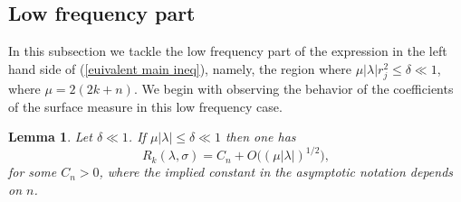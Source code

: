 \documentclass[11pt, reqno]{amsart}
\theoremstyle{plain}
\newtheorem{lemma}[theorem]{Lemma}
\theoremstyle{remark}
\theoremstyle{example}
\theoremstyle{definition}
\numberwithin{equation}{section}
\begin{document}
\subsection{Low frequency part } \label{Low part}
In this subsection we tackle the low frequency part of the expression in the left hand side of (\ref{euivalent main ineq}), namely, the region where $\mu |\lambda|   r_{j}^2 \leq \delta  \ll 1$, where $\mu = 2(2k+n)$. We begin with observing the behavior of the coefficients of the surface measure in this low frequency case.
\begin{lemma}\label{Surface coeff. low}
    Let $\delta \ll 1$. If $\mu |\lambda| \leq \delta \ll 1$ then one has 
    \begin{equation}\label{Low frequency surface coeff}
        R_{k}(\lambda, \sigma) =  C_{n} + O \big( (\mu |\lambda|)^{1/2} \big),
    \end{equation}
    for some $C_{n}>0$, where the implied constant in the asymptotic notation  depends on $n$.
\end{lemma}
\end{document}
